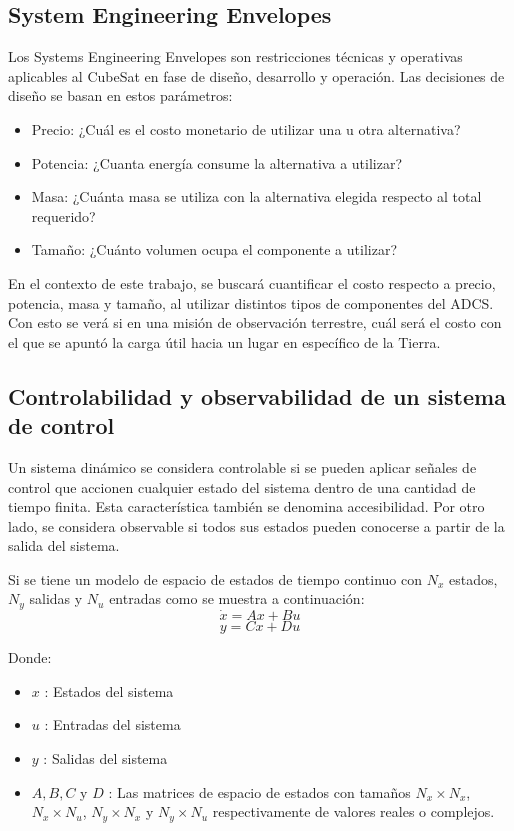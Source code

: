 \subsection{System Engineering Envelopes}

Los Systems Engineering Envelopes son restricciones técnicas y operativas aplicables al CubeSat en fase de diseño, desarrollo y operación. Las decisiones de diseño se basan en estos parámetros:

\begin{itemize}
	\item Precio: ¿Cuál es el costo monetario de utilizar una u otra alternativa?
	\item Potencia: ¿Cuanta energía consume la alternativa a utilizar?
	\item Masa: ¿Cuánta masa se utiliza con la alternativa elegida respecto al total requerido?
	\item Tamaño: ¿Cuánto volumen ocupa el componente a utilizar?
\end{itemize}

En el contexto de este trabajo, se buscará cuantificar el costo respecto a precio, potencia, masa y tamaño, al utilizar distintos tipos de componentes del ADCS. Con esto se verá si en una misión de observación terrestre, cuál será el costo con el que se apuntó la carga útil hacia un lugar en específico de la Tierra.

\subsection{Controlabilidad y observabilidad de un sistema de control}

Un sistema dinámico se considera controlable si se pueden aplicar señales de control que accionen cualquier estado del sistema dentro de una cantidad de tiempo finita. Esta característica también se denomina accesibilidad. Por otro lado, se considera observable si todos sus estados pueden conocerse a partir de la salida del sistema.

Si se tiene un modelo de espacio de estados de tiempo continuo con \( N_x \) estados, \( N_y \) salidas y \( N_u \) entradas como se muestra a continuación:
\[
	\dot{x} = Ax + Bu
\]
\[
	y = Cx + Du
\]

Donde:
\begin{itemize}
	\item \( x \) : Estados del sistema
	\item \( u \) : Entradas del sistema
	\item \( y \) : Salidas del sistema
	\item \( A, B, C \) y \( D \) : Las matrices de espacio de estados con tamaños \( N_x \times N_x \), \( N_x \times N_u \), \( N_y \times N_x \) y \( N_y \times N_u \) respectivamente de valores reales o complejos.
\end{itemize}

